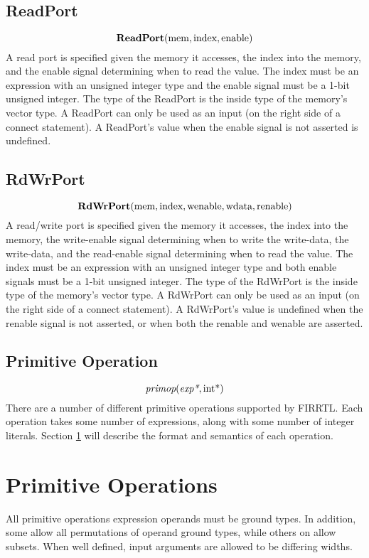 \documentclass[10pt]{article}
\begin{document}
\subsection{ReadPort}
\[
\text{\bf ReadPort}(\text{mem},\text{index},\text{enable})
\]
A read port is specified given the memory it accesses, the index into the memory, and the enable signal determining when to read the value.
The index must be an expression with an unsigned integer type and the enable signal must be a 1-bit unsigned integer. 
The type of the ReadPort is the inside type of the memory's vector type.
A ReadPort can only be used as an input (on the right side of a connect statement).
A ReadPort's value when the enable signal is not asserted is undefined.

\subsection{RdWrPort}
\[
\text{\bf RdWrPort}(\text{mem},\text{index},\text{wenable},\text{wdata},\text{renable})
\]
A read/write port is specified given the memory it accesses, the index into the memory, the write-enable signal determining when to write the write-data, the write-data, and the read-enable signal determining when to read the value.
The index must be an expression with an unsigned integer type and both enable signals must be a 1-bit unsigned integer. 
The type of the RdWrPort is the inside type of the memory's vector type.
A RdWrPort can only be used as an input (on the right side of a connect statement).
A RdWrPort's value is undefined when the renable signal is not asserted, or when both the renable and wenable are asserted.

\subsection{Primitive Operation}
\[
\text{\em primop}(\text{\em exp*}, \text{int}\text{*})
\]
There are a number of different primitive operations supported by FIRRTL. 
Each operation takes some number of expressions, along with some number of integer literals.
Section \ref{primitives} will describe the format and semantics of each operation.


\section{Primitive Operations} \label{primitives}

All primitive operations expression operands must be ground types.
In addition, some allow all permutations of operand ground types, while others on allow subsets.
When well defined, input arguments are allowed to be differing widths.
\end{document}
